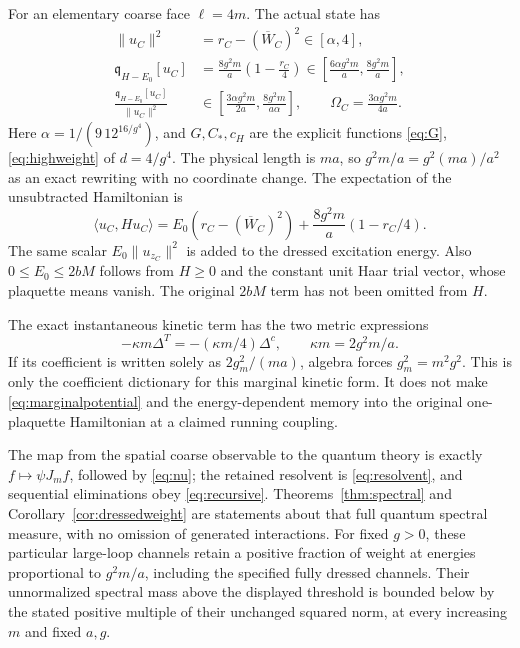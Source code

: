 \documentclass[11pt]{article}
\begin{document}
For an elementary coarse face $\ell=4m$. The actual state has
\begin{align}
 \|u_C\|^2&=r_C-(\overline W_C)^2\in[\alpha,4],\label{eq:physicalnorm}\\
 \mathfrak q_{H-E_0}[u_C]
 &=\frac{8g^2m}{a}\left(1-\frac{r_C}{4}\right)
       \in\left[\frac{6\alpha g^2m}{a},\frac{8g^2m}{a}\right],\label{eq:physicalenergy}\\
 \frac{\mathfrak q_{H-E_0}[u_C]}{\|u_C\|^2}
 &\in\left[\frac{3\alpha g^2m}{2a},\frac{8g^2m}{a\alpha}\right],
 \qquad \Omega_C=\frac{3\alpha g^2m}{4a}.\label{eq:physicalquotient}
\end{align}
Here
$\alpha=1/(9\,12^{16/g^4})$, and $G,C_*,c_H$ are the explicit functions
\eqref{eq:G}, \eqref{eq:highweight} of $d=4/g^4$.
The physical length is $ma$, so $g^2m/a=g^2(ma)/a^2$ as an exact
rewriting with no coordinate change. The expectation of the unsubtracted
Hamiltonian is
\[
 \langle u_C,Hu_C\rangle
 =E_0(r_C-(\overline W_C)^2)
       +\frac{8g^2m}{a}(1-r_C/4).
\]
The same scalar $E_0\|u_{z_C}\|^2$ is added to the dressed excitation
energy. Also $0\leq E_0\leq2bM$ follows from $H\geq0$ and the constant
unit Haar trial vector, whose plaquette means vanish. The original
$2bM$ term has not been omitted from $H$.

The exact instantaneous kinetic term has the two metric expressions
\[
 -\kappa m\Delta^T=-(\kappa m/4)\Delta^c,\qquad \kappa m=2g^2m/a.
\]
If its coefficient is written solely as
$2g_m^2/(ma)$, algebra forces $g_m^2=m^2g^2$. This is only the
coefficient dictionary for this marginal kinetic form. It does not make
\eqref{eq:marginalpotential} and the energy-dependent memory into the
original one-plaquette Hamiltonian at a claimed running coupling.

The map from the spatial coarse observable to the quantum theory is
exactly $f\mapsto\psi J_mf$, followed by \eqref{eq:nu}; the retained
resolvent is \eqref{eq:resolvent}, and sequential eliminations obey
\eqref{eq:recursive}. Theorems~\ref{thm:spectral} and
Corollary~\ref{cor:dressedweight} are statements about that full quantum
spectral measure, with no omission of generated interactions. For fixed
$g>0$, these particular large-loop channels retain a positive fraction
of weight at energies proportional to $g^2m/a$, including the specified
fully dressed channels. Their unnormalized spectral mass above the
displayed threshold is bounded below by the stated positive multiple
of their unchanged squared norm, at every increasing $m$ and fixed $a,g$.
\end{document}
